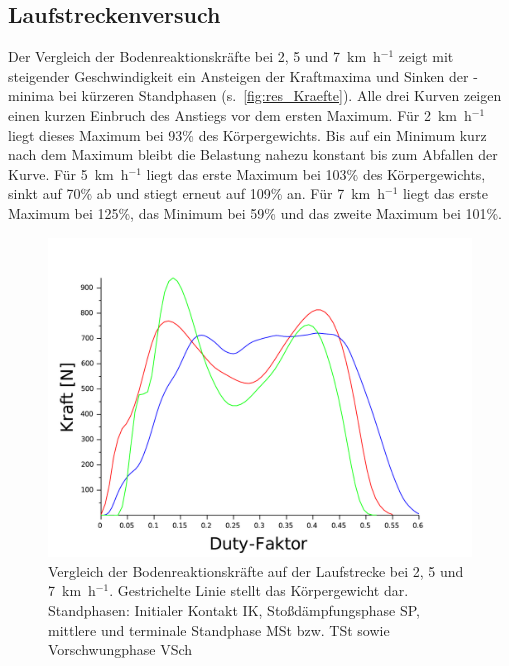 \subsection{Laufstreckenversuch}
Der Vergleich der Bodenreaktionskräfte bei 2, 5 und 7~km~h$^{-1}$ zeigt mit steigender Geschwindigkeit ein Ansteigen der Kraftmaxima und Sinken der -minima bei kürzeren Standphasen (s.~\autoref{fig:res_Kraefte}). Alle drei Kurven zeigen einen kurzen Einbruch des Anstiegs vor dem ersten Maximum. Für 2~km~h$^{-1}$ liegt dieses Maximum bei 93\% des Körpergewichts. Bis auf ein Minimum kurz nach dem Maximum bleibt die Belastung nahezu konstant bis zum Abfallen der Kurve. Für 5~km~h$^{-1}$ liegt das erste Maximum bei 103\% des Körpergewichts, sinkt auf 70\% ab und stiegt erneut auf 109\% an. Für 7~km~h$^{-1}$ liegt das erste Maximum bei 125\%, das Minimum bei 59\% und das zweite Maximum bei 101\%.\\

\begin{figure}[h!]
	\centering
	\includegraphics[width=0.7\linewidth]{bilder/Ergebnisse/BRK}
	\caption[Bodenreaktionskräfte]{Vergleich der Bodenreaktionskräfte auf der Laufstrecke bei 2, 5 und 7~km~h$^{-1}$. Gestrichelte Linie stellt das Körpergewicht dar. Standphasen: Initialer Kontakt IK, Stoßdämpfungsphase SP, mittlere und terminale Standphase MSt bzw. TSt sowie Vorschwungphase VSch}
	\label{fig:res_Kraefte}
\end{figure}

